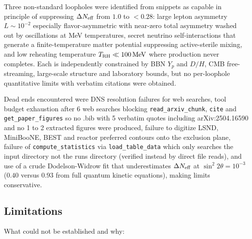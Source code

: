 \documentclass[11pt,a4paper]{article}
\begin{document}
Three non-standard loopholes were identified from snippets as capable in principle of suppressing $\Delta N_{\rm eff}$ from $1.0$ to $<0.28$: large lepton asymmetry $L \sim 10^{-2}$ especially flavor-asymmetric with near-zero total asymmetry washed out by oscillations at MeV temperatures, secret neutrino self-interactions that generate a finite-temperature matter potential suppressing active-sterile mixing, and low reheating temperature $T_{\rm RH} \ll 100\,\mathrm{MeV}$ where production never completes. Each is independently constrained by BBN $Y_p$ and $D/H$, CMB free-streaming, large-scale structure and laboratory bounds, but no per-loophole quantitative limits with verbatim citations were obtained.

Dead ends encountered were DNS resolution failures for web searches, tool budget exhaustion after 6 web searches blocking \texttt{read\_\allowbreak{}arxiv\_\allowbreak{}chunk}, \texttt{cite} and \texttt{get\_\allowbreak{}paper\_\allowbreak{}figures} so no .bib with 5 verbatim quotes including arXiv:2504.16590 and no 1 to 2 extracted figures were produced, failure to digitize LSND, MiniBooNE, BEST and reactor preferred contours onto the exclusion plane, failure of \texttt{compute\_\allowbreak{}statistics} via \texttt{load\_\allowbreak{}table\_\allowbreak{}data} which only searches the input directory not the runs directory (verified instead by direct file reads), and use of a crude Dodelson-Widrow fit that underestimates $\Delta N_{\rm eff}$ at $\sin^2 2\theta = 10^{-3}$ ($0.40$ versus $0.93$ from full quantum kinetic equations), making limits conservative.

\subsection{Limitations}
What could not be established and why:
\end{document}
